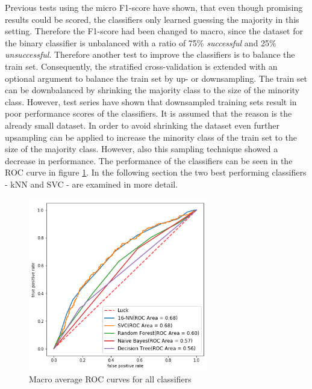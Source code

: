 Previous tests using the micro F1-score have shown, that even though promising results could be scored, the classifiers only learned guessing the majority in this setting. Therefore the F1-score had been changed to macro,
 since the dataset for the binary classifier is unbalanced with a ratio of 75\% \textit{successful} and 25\% \textit{unsuccessful}. Therefore another test to improve the classifiers is to balance the train set.
Consequently, the stratified cross-validation is extended with an optional argument to balance the train set by up- or downsampling.
The train set can be downbalanced by shrinking the majority class to the size of the minority class. However, test series have shown that downsampled training sets result in poor performance scores of the classifiers. It is assumed that the reason is the already small dataset.
In order to avoid shrinking the dataset even further upsampling can be applied to increase the minority class of the train set to the size of the majority class. However, also this sampling technique showed a decrease in performance.
The performance of the classifiers can be seen in the ROC curve in figure \ref{img:roc}.
In the following section the two best performing classifiers - kNN and SVC - are examined in more detail.
\begin{figure}[h]
	\center
	\includegraphics[width=0.7\textwidth]{images/roc.png}
	\caption{Macro average ROC curves for all classifiers}
	\label{img:roc}
\end{figure}


